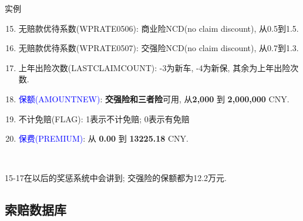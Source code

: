\documentclass[professionalfont]{beamer}
\newcommand{\green}[1]{\textbf{#1}}
\newcommand{\blue}[1]{\textcolor{blue}{#1}}
\begin{document}
\begin{frame}{实例}	
	\begin{enumerate}	
		\setcounter{enumi}{14}
		\item 无赔款优待系数(WPRATE0506): 商业险NCD(no claim discount), 从0.5到1.5.
		\item 无赔款优待系数(WPRATE0507): 交强险NCD(no claim discount), 从0.7到1.3.
		\item 上年出险次数(LASTCLAIMCOUNT): -3为新车, -4为新保, 其余为上年出险次数.  
		\item \blue{保额(AMOUNTNEW)}: \green{交强险和三者险}可用, 从\green{2,000} 到 \green{2,000,000} CNY.
		\item 不计免赔(FLAG): 1表示不计免赔; 0表示有免赔
		\item \blue{保费(PREMIUM)}: 从 \green{0.00} 到 \green{13225.18} CNY.
	\end{enumerate}
	
	~
	
	15-17在以后的奖惩系统中会讲到; 交强险的保额都为12.2万元.
\end{frame}


\subsection{索赔数据库}
\end{document}
